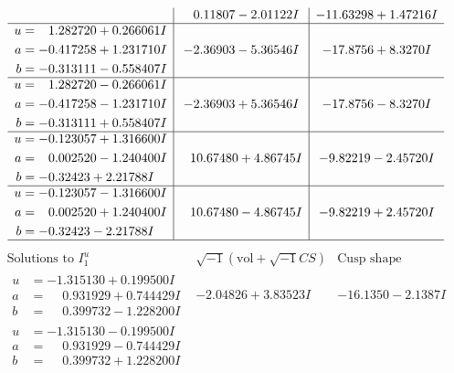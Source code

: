 \documentclass[1p]{elsarticle_modified}
\theoremstyle{definition}
\newcommand{\I}{\sqrt{-1}}
\begin{document}
$$\begin{array}{c|c|c}
 & \phantom{-}0.11807 - 2.01122 I & -11.63298 + 1.47216 I \\ \hline\begin{aligned}
u &= \phantom{-}1.282720 + 0.266061 I \\
a &= -0.417258 + 1.231710 I \\
b &= -0.313111 - 0.558407 I\end{aligned}
 & -2.36903 - 5.36546 I & -17.8756 + 8.3270 I \\ \hline\begin{aligned}
u &= \phantom{-}1.282720 - 0.266061 I \\
a &= -0.417258 - 1.231710 I \\
b &= -0.313111 + 0.558407 I\end{aligned}
 & -2.36903 + 5.36546 I & -17.8756 - 8.3270 I \\ \hline\begin{aligned}
u &= -0.123057 + 1.316600 I \\
a &= \phantom{-}0.002520 - 1.240400 I \\
b &= -0.32423 + 2.21788 I\end{aligned}
 & \phantom{-}10.67480 + 4.86745 I & -9.82219 - 2.45720 I \\ \hline\begin{aligned}
u &= -0.123057 - 1.316600 I \\
a &= \phantom{-}0.002520 + 1.240400 I \\
b &= -0.32423 - 2.21788 I\end{aligned}
 & \phantom{-}10.67480 - 4.86745 I & -9.82219 + 2.45720 I\\
 \hline 
 \end{array}$$\newpage$$\begin{array}{c|c|c}  
\text{Solutions to }I^u_{1}& \I (\text{vol} + \sqrt{-1}CS) & \text{Cusp shape}\\
 \hline 
\begin{aligned}
u &= -1.315130 + 0.199500 I \\
a &= \phantom{-}0.931929 + 0.744429 I \\
b &= \phantom{-}0.399732 - 1.228200 I\end{aligned}
 & -2.04826 + 3.83523 I & -16.1350 - 2.1387 I \\ \hline\begin{aligned}
u &= -1.315130 - 0.199500 I \\
a &= \phantom{-}0.931929 - 0.744429 I \\
b &= \phantom{-}0.399732 + 1.228200 I\end{aligned}

\end{array}$$
\end{document}
